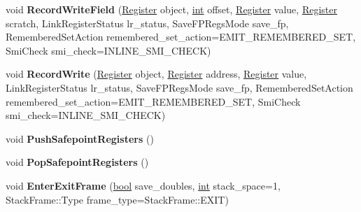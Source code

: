 \begin{DoxyCompactItemize}
\item 
\mbox{\label{classv8_1_1internal_1_1MacroAssembler_a612d90391b176f5d40e0349ed4a82439}} 
void {\bfseries Record\+Write\+Field} (\mbox{\hyperlink{classv8_1_1internal_1_1Register}{Register}} object, \mbox{\hyperlink{classint}{int}} offset, \mbox{\hyperlink{classv8_1_1internal_1_1Register}{Register}} value, \mbox{\hyperlink{classv8_1_1internal_1_1Register}{Register}} scratch, Link\+Register\+Status lr\+\_\+status, Save\+F\+P\+Regs\+Mode save\+\_\+fp, Remembered\+Set\+Action remembered\+\_\+set\+\_\+action=E\+M\+I\+T\+\_\+\+R\+E\+M\+E\+M\+B\+E\+R\+E\+D\+\_\+\+S\+ET, Smi\+Check smi\+\_\+check=I\+N\+L\+I\+N\+E\+\_\+\+S\+M\+I\+\_\+\+C\+H\+E\+CK)
\item 
\mbox{\label{classv8_1_1internal_1_1MacroAssembler_aafeb4e1da90d61d024029e1f75ca4490}} 
void {\bfseries Record\+Write} (\mbox{\hyperlink{classv8_1_1internal_1_1Register}{Register}} object, \mbox{\hyperlink{classv8_1_1internal_1_1Register}{Register}} address, \mbox{\hyperlink{classv8_1_1internal_1_1Register}{Register}} value, Link\+Register\+Status lr\+\_\+status, Save\+F\+P\+Regs\+Mode save\+\_\+fp, Remembered\+Set\+Action remembered\+\_\+set\+\_\+action=E\+M\+I\+T\+\_\+\+R\+E\+M\+E\+M\+B\+E\+R\+E\+D\+\_\+\+S\+ET, Smi\+Check smi\+\_\+check=I\+N\+L\+I\+N\+E\+\_\+\+S\+M\+I\+\_\+\+C\+H\+E\+CK)
\item 
\mbox{\label{classv8_1_1internal_1_1MacroAssembler_aca545d9193d7a468e285a5ba66fb6f19}} 
void {\bfseries Push\+Safepoint\+Registers} ()
\item 
\mbox{\label{classv8_1_1internal_1_1MacroAssembler_accf004371b050ef53eb57724f4d8d8b1}} 
void {\bfseries Pop\+Safepoint\+Registers} ()
\item 
\mbox{\label{classv8_1_1internal_1_1MacroAssembler_a02e533f38645b5ba77bd0549968b59e7}} 
void {\bfseries Enter\+Exit\+Frame} (\mbox{\hyperlink{classbool}{bool}} save\+\_\+doubles, \mbox{\hyperlink{classint}{int}} stack\+\_\+space=1, Stack\+Frame\+::\+Type frame\+\_\+type=Stack\+Frame\+::\+E\+X\+IT)
\item 
\mbox{\label{classv8_1_1internal_1_1MacroAssembler_aebb4e8ea72d795f41fc8abdfea974d2a}} 

\end{DoxyCompactItemize}

